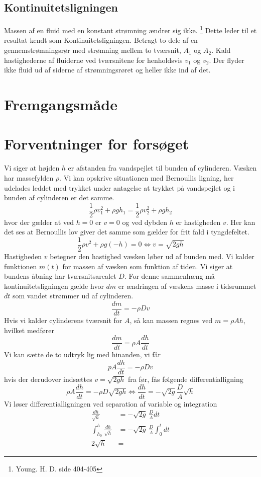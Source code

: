 \documentclass[a4paper, 11pt]{article}
\begin{document}
\subsection{Kontinuitetsligningen}
Massen af en fluid med en konstant strømning ændrer sig ikke. \footnote{Young. H. D. side 404-405}
Dette leder til et resultat kendt som Kontinuitetsligningen. Betragt to dele af en gennemstrømningsrør med strømning mellem to tværsnit, \(A_1\) og \(A_2\). Kald hastighederne af fluiderne ved tværsnitene for henholdsvis \(v_1\) og \(v_2\).
Der flyder ikke fluid ud af siderne af strømningsrøret og heller ikke ind af det. 
\section{Fremgangsmåde}

\section{Forventninger for forsøget}
Vi siger at højden \(h\) er afstanden fra vandspejlet til bunden af cylinderen. Væsken har massefylden \(\rho\). Vi kan opskrive situationen med Bernoullis ligning, her udelades leddet med trykket under antagelse at trykket på vandspejlet og i bunden af cylinderen er det samme.
\begin{equation}
    \frac{1}{2}\rho v_1^2+\rho g h_1 = \frac{1}{2}\rho v_2^2+\rho g h_2
\end{equation}
hvor der gælder at ved \(h=0\) er \(v=0\) og ved dybden \(h\) er hastigheden \(v\).
Her kan det ses at Bernoullis lov giver det samme som gælder for frit fald i tyngdefeltet.
\begin{equation}
    \frac{1}{2}\rho v^2+\rho g (-h)=0 \Leftrightarrow v=\sqrt{2gh}
\end{equation}
Hastigheden \(v\) betegner den hastighed væsken løber ud af bunden med. 
Vi kalder funktionen \(m(t)\) for massen af væsken som funktion af tiden. Vi siger at bundens åbning har tværsnitsarealet \(D\).
For denne sammenhæng må kontinuitetsligningen gælde hvor \(dm\) er ændringen af væskens masse i tidsrummet \(dt\) som vandet strømmer ud af cylinderen.
\[\frac{dm}{dt}=-\rho Dv\]
Hvis vi kalder cylinderens tværsnit for \(A\), så kan massen regnes ved \(m=\rho A h\), hvilket medfører
\[\frac{dm}{dt}= \rho A \frac{dh}{dt}\]
Vi kan sætte de to udtryk lig med hinanden, vi får
\[pA \frac{dh}{dt}=-\rho Dv\]
hvis der derudover indsættes \(v=\sqrt{2gh}\) fra før, fås følgende differentialligning
\begin{equation}
    \rho A \frac{dh}{dt} = -\rho D \sqrt{2gh} \Leftrightarrow \frac{dh}{dt} = -\sqrt{2g}\, \frac{D}{A}\sqrt{h} 
\end{equation}
Vi løser differentialligningen ved separation af variable og integration
\begin{align*}
    \frac{dh}{\sqrt{h}}&=-\sqrt{2g}\,\frac{D}{A}dt\\
    \int_{h_0}^{h}\frac{dh}{\sqrt{h}}&=-\sqrt{2g}\,\frac{D}{A} \int_0^t dt\\
    2\sqrt{h}&=
\end{align*} 
\end{document}
